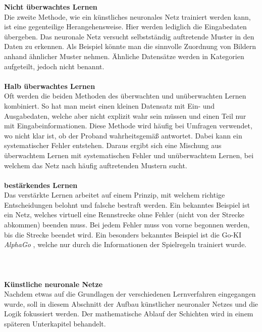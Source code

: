 \textbf{Nicht überwachtes Lernen}\\
Die zweite Methode, wie ein künstliches neuronales Netz trainiert werden kann, ist eine gegenteilige Herangehensweise. Hier werden lediglich die Eingabedaten übergeben. Das neuronale Netz versucht selbstständig auftretende Muster in den Daten zu erkennen. Als Beispiel könnte man die sinnvolle Zuordnung von Bildern anhand ähnlicher Muster nehmen. Ähnliche Datensätze werden in Kategorien aufgeteilt, jedoch nicht benannt.\\\\
\textbf{Halb überwachtes Lernen}\\
Oft werden die beiden Methoden des überwachten und unüberwachten Lernen kombiniert. So hat man meist einen kleinen Datensatz mit Ein- und Ausgabedaten, welche aber nicht explizit wahr sein müssen und einen Teil nur mit Eingabeinformationen. Diese Methode wird häufig bei Umfragen verwendet, wo nicht klar ist, ob der Proband wahrheitsgemäß antwortet. Dabei kann ein systematischer Fehler entstehen. Daraus ergibt sich eine Mischung aus überwachtem Lernen mit systematischen Fehler und unüberwachtem Lernen, bei welchem das Netz nach häufig auftretenden Mustern sucht.\\\\
\textbf{bestärkendes Lernen}\\ 
Das verstärkte Lernen arbeitet auf einem Prinzip, mit welchem richtige Entscheidungen belohnt und falsche bestraft werden. Ein bekanntes Beispiel ist ein Netz, welches virtuell eine Rennstrecke ohne Fehler (nicht von der Strecke abkommen) beenden muss. Bei jedem Fehler muss von vorne begonnen werden, bis die Strecke beendet wird. Ein besonders bekanntes Beispiel ist die Go-KI \textit{AlphaGo} \cite{Alpha2016GO}, welche nur durch die Informationen der Spielregeln trainiert wurde.\\\\\\\\
\textbf{Künstliche neuronale Netze}\\
Nachdem etwas auf die Grundlagen der verschiedenen Lernverfahren eingegangen wurde, soll in diesem Abschnitt der Aufbau künstlicher neuronaler Netzes und die Logik fokussiert werden. Der mathematische Ablauf der Schichten wird in einem späteren Unterkapitel behandelt.\\
